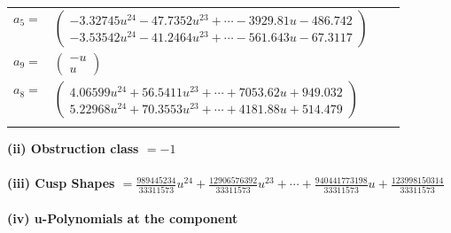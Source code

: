\documentclass[1p]{elsarticle_modified}
\theoremstyle{definition}
\begin{document}
\begin{tabular}{m{7pt} m{180pt} m{7pt} m{180pt} }
\flushright $a_{5}=$&$\begin{pmatrix}-3.32745 u^{24}-47.7352 u^{23}+\cdots-3929.81 u-486.742\\-3.53542 u^{24}-41.2464 u^{23}+\cdots-561.643 u-67.3117\end{pmatrix}$ \\
\flushright $a_{9}=$&$\begin{pmatrix}- u\\u\end{pmatrix}$ \\
\flushright $a_{8}=$&$\begin{pmatrix}4.06599 u^{24}+56.5411 u^{23}+\cdots+7053.62 u+949.032\\5.22968 u^{24}+70.3553 u^{23}+\cdots+4181.88 u+514.479\end{pmatrix}$\\&\end{tabular}
\flushleft \textbf{(ii) Obstruction class $= -1$}\\~\\
\flushleft \textbf{(iii) Cusp Shapes $= \frac{989445234}{33311573} u^{24}+\frac{12906576392}{33311573} u^{23}+\cdots+\frac{940441773198}{33311573} u+\frac{123998150314}{33311573}$}\\~\\
\newpage\renewcommand{\arraystretch}{1}
\flushleft \textbf{(iv) u-Polynomials at the component}\newline \\
\end{document}
